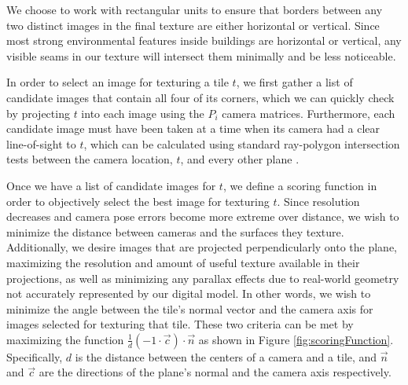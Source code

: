 \documentclass[]{spie}  %
\begin{document}
We choose to work with rectangular units to ensure that borders
between any two distinct images in the final texture are either
horizontal or vertical. Since most strong environmental features
inside buildings are horizontal or vertical, any visible seams in our
texture will intersect them minimally and be less noticeable.

In order to select an image for texturing a tile $t$, we first gather
a list of candidate images that contain all four of its corners, which
we can quickly check by projecting $t$ into each image using the $P_i$
camera matrices. Furthermore, each candidate image must have been
taken at a time when its camera had a clear line-of-sight to $t$,
which can be calculated using standard ray-polygon intersection tests
between the camera location, $t$, and every other plane
\cite{rayintersection}.

Once we have a list of candidate images for $t$, we define a scoring
function in order to objectively select the best image for texturing
$t$. Since resolution decreases and camera pose errors become more
extreme over distance, we wish to minimize the distance between
cameras and the surfaces they texture. Additionally, we desire images
that are projected perpendicularly onto the plane, maximizing the
resolution and amount of useful texture available in their
projections, as well as minimizing any parallax effects due to
real-world geometry not accurately represented by our digital
model. In other words, we wish to minimize the angle between the
tile's normal vector and the camera axis for images selected for
texturing that tile. These two criteria can be met by maximizing the
function $\frac{1}{d} (-1 \cdot \vec{c}) \cdot \vec{n}$ as shown in
Figure \ref{fig:scoringFunction}. Specifically, $d$ is the distance
between the centers of a camera and a tile, and $\vec{n}$ and
$\vec{c}$ are the directions of the plane's normal and the camera axis
respectively.
\end{document}
